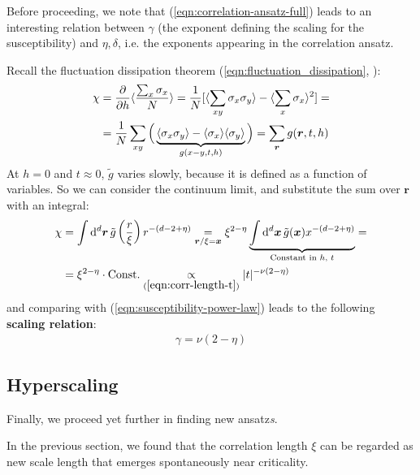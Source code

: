 \documentclass[../../main.tex]{subfiles}
\begin{document}
Before proceeding, we note that (\ref{eqn:correlation-ansatz-full}) leads to an interesting relation between $\gamma$ (the exponent defining the scaling for the susceptibility) and $\eta, \delta$, i.e. the exponents appearing in the correlation ansatz.

\medskip

Recall the fluctuation dissipation theorem (\ref{eqn:fluctuation_dissipation}, \pageref{eqn:fluctuation_dissipation}):
\begin{align*}
    \chi &= \pdv{h} \langle \frac{\sum_x \sigma_x}{N}  \rangle = \frac{1}{N}[ \langle \sum_{xy} \sigma_x \sigma_y \rangle - \langle \sum_x \sigma_x \rangle^2]  =\\
    &= \frac{1}{N} \sum_{xy} \Big(\underbrace{\langle \sigma_x \sigma_y \rangle - \langle \sigma_x \rangle \langle \sigma_y \rangle}_{g(x-y, t, h)} \Big) = \sum_{\bm{r}} g(\bm{r}, t, h) 
\end{align*}
At $h=0$ and $t\approx 0$, $\tilde{g}$ varies slowly, because it is defined as a function of  variables. So we can consider the continuum limit, and substitute the sum over $\bm{r}$ with an integral:
\begin{align*}
    \chi &= \int \dd[d]{\bm{r}} \tilde{g}\left(\frac{r}{\xi} \right) r^{-(d-2+\eta)} \underset{\bm{r}/\xi = \bm{x}}{=} \xi^{2-\eta} \underbrace{\int \dd[d]{\bm{x}} \tilde{g}(\bm{x}) x^{-(d-2+\eta)}}_{\text{Constant in $h$, $t$}} =\\
    &= \xi^{2- \eta} \cdot \text{Const.} \underset{(\ref{eqn:corr-length-t})}{\propto} |t|^{-\nu(2-\eta)}  
\end{align*}
and comparing with (\ref{eqn:susceptibility-power-law}) leads to the following \textbf{scaling relation}:
\begin{align}\label{eqn:scaling-relation}
    \gamma = \nu (2 - \eta)
\end{align} %

\subsection{Hyperscaling}
Finally, we proceed yet further in finding new ansatz\textit{s}. 

In the previous section, we found that the correlation length $\xi$ can be regarded as new scale length that emerges spontaneously near criticality. 
\end{document}
